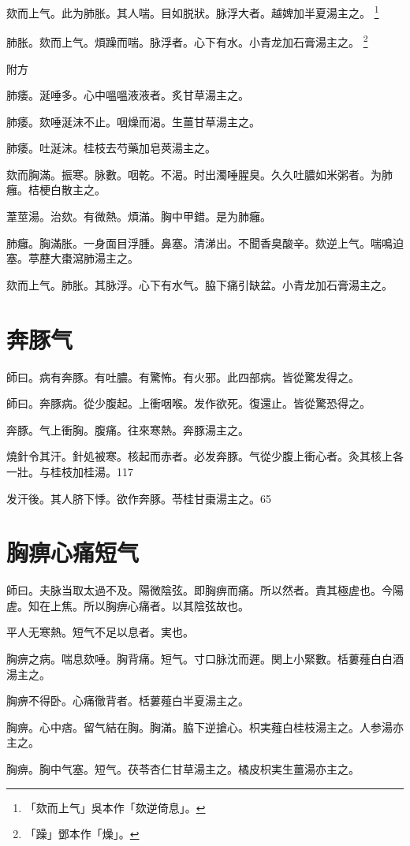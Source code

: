 \documentclass[12pt,twoside,UTF8,b5paper]{ctexbook}
\begin{document}
欬而上气。此为肺胀。其人喘。目如脱狀。脉浮大者。越婢加半夏湯主之。
	\footnote{「欬而上气」吳本作「欬逆倚息」。}

肺胀。欬而上气。煩躁而喘。脉浮者。心下有水。小青龙加石膏湯主之。
	\footnote{「躁」鄧本作「燥」。}

附方

肺痿。涎唾多。心中嗢嗢液液者。炙甘草湯主之。

肺痿。欬唾涎沫不止。咽燥而渴。生薑甘草湯主之。

肺痿。吐涎沫。桂枝去芍藥加皂莢湯主之。

欬而胸滿。振寒。脉數。咽乾。不渴。时出濁唾腥臭。久久吐膿如米粥者。为肺癰。桔梗白散主之。

葦莖湯。治欬。有微熱。煩滿。胸中甲錯。是为肺癰。

肺癰。胸滿胀。一身面目浮腫。鼻塞。清涕出。不聞香臭酸辛。欬逆上气。喘鳴迫塞。葶藶大棗瀉肺湯主之。

欬而上气。肺胀。其脉浮。心下有水气。脇下痛引缺盆。小青龙加石膏湯主之。

\chapter{奔豚气}

師曰。病有奔豚。有吐膿。有驚怖。有火邪。此四部病。皆從驚发得之。

師曰。奔豚病。從少腹起。上衝咽喉。发作欲死。復還止。皆從驚恐得之。

奔豚。气上衝胸。腹痛。往來寒熱。奔豚湯主之。

燒針令其汗。針処被寒。核起而赤者。必发奔豚。气從少腹上衝心者。灸其核上各一壯。与桂枝加桂湯。117

发汗後。其人脐下悸。欲作奔豚。苓桂甘棗湯主之。65

\chapter{胸痹心痛短气}

師曰。夫脉当取太過不及。陽微陰弦。即胸痹而痛。所以然者。責其極虗也。今陽虗。知在上焦。所以胸痹心痛者。以其陰弦故也。

平人无寒熱。短气不足以息者。実也。

胸痹之病。喘息欬唾。胸背痛。短气。寸口脉沈而遲。関上小緊數。栝蔞薤白白酒湯主之。

胸痹不得卧。心痛徹背者。栝蔞薤白半夏湯主之。

胸痹。心中痞。留气結在胸。胸滿。脇下逆搶心。枳実薤白桂枝湯主之。人参湯亦主之。

胸痹。胸中气塞。短气。茯苓杏仁甘草湯主之。橘{皮}枳{実生}薑湯亦主之。
\end{document}
